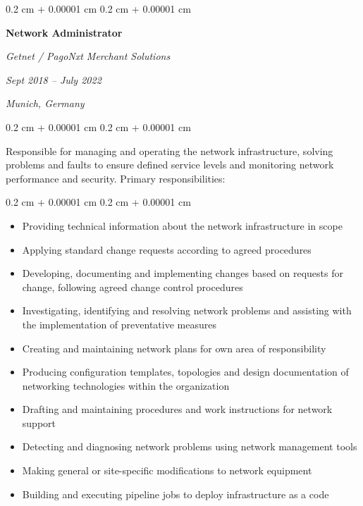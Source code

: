 \documentclass[10pt, a4paper]{article}
\newenvironment{highlights}{
    \begin{itemize}[
        topsep=0.10 cm,
        parsep=0.10 cm,
        partopsep=0pt,
        itemsep=0pt,
        leftmargin=0.4 cm + 10pt
    ]
}{
    \end{itemize}
} %
\newenvironment{onecolentry}{
    \begin{adjustwidth}{
        0.2 cm + 0.00001 cm
    }{
        0.2 cm + 0.00001 cm
    }
}{
    \end{adjustwidth}
} %
\newenvironment{twocolentry}[2][]{
    \onecolentry
    \def\secondColumn{#2}
    \setcolumnwidth{\fill, 4.5 cm}
    \begin{paracol}{2}
}{
    \switchcolumn \raggedleft \secondColumn
    \end{paracol}
    \endonecolentry
} %
\begin{document}
        \vspace{0.2 cm}

        \begin{twocolentry}{
        \textit{Sept 2018 – July 2022}


        \textit{Munich, Germany}}
            \large\textbf{Network Administrator}
            
            \textit{Getnet / PagoNxt Merchant Solutions}
        \end{twocolentry}

        \vspace{0.10 cm}

        \begin{onecolentry}
        Responsible for managing and operating the network infrastructure, solving problems and faults to ensure defined service levels and monitoring network performance and security. Primary responsibilities:
        \end{onecolentry}

        \vspace{0.10 cm}

        \begin{onecolentry}
            \begin{highlights}
                \item Providing technical information about the network infrastructure in scope
                \item Applying standard change requests according to agreed procedures
                \item Developing, documenting and implementing changes based on requests for change, following agreed change control procedures
                \item Investigating, identifying and resolving network problems and assisting with the implementation of preventative measures
                \item Creating and maintaining network plans for own area of responsibility
                \item Producing configuration templates, topologies and design documentation of networking technologies within the organization
                \item Drafting and maintaining procedures and work instructions for network support
                \item Detecting and diagnosing network problems using network management tools
                \item Making general or site-specific modifications to network equipment
                \item Building and executing pipeline jobs to deploy infrastructure as a code
            \end{highlights}
        \end{onecolentry}
\end{document}
